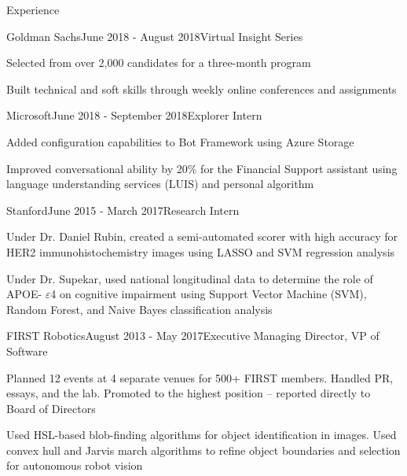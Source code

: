 \documentclass{resume} %
\begin{document}
\begin{rSection}{Experience}

\begin{rSubsection}{Goldman Sachs}{June 2018 - August 2018}{Virtual Insight Series}{}
\item Selected from over 2,000 candidates for a three-month program
\item Built technical and soft skills through weekly online conferences and assignments
\end{rSubsection}



\begin{rSubsection}{Microsoft}{June 2018 - September 2018}{Explorer Intern}{}
\item Added configuration capabilities to Bot Framework using Azure Storage
\item Improved conversational ability by 20$\%$ for the Financial Support assistant using language understanding services (LUIS) and personal algorithm
\end{rSubsection}


\begin{rSubsection}{Stanford}{June 2015 - March 2017}{Research Intern}{}
\item Under Dr. Daniel Rubin, created a semi-automated scorer with high accuracy for HER2 immunohistochemistry images using LASSO and SVM regression analysis
\item Under Dr. Supekar, used national longitudinal data to determine the role of APOE- $\varepsilon$4 on cognitive impairment using Support Vector Machine (SVM), Random Forest, and Naive Bayes classification analysis
\end{rSubsection}


\begin{rSubsection}{FIRST Robotics}{August 2013 - May 2017}{Executive Managing Director, VP of Software}{}
\item Planned 12 events at 4 separate venues for 500+ FIRST members. Handled PR, essays, and the lab. Promoted to the highest position – reported directly to Board of Directors
\item Used HSL-based blob-finding algorithms for object identification in images. Used convex hull and Jarvis march algorithms to refine object boundaries and selection for autonomous robot vision
\end{rSubsection}

\end{rSection}
\end{document}
